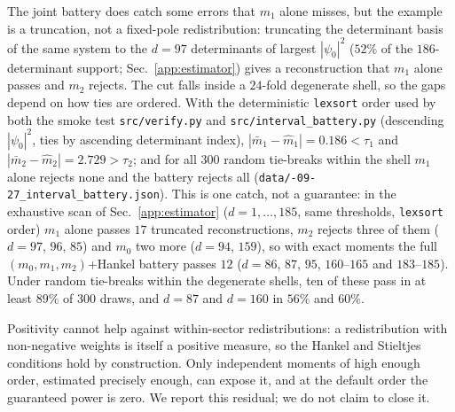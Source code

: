 \documentclass[aps,prb,onecolumn,superscriptaddress,longbibliography,floatfix]{revtex4-2}
\begin{document}
The joint battery does catch some errors that $m_1$ alone misses, but the example is a truncation, not a fixed-pole redistribution: truncating the determinant basis of the same system to the $d=97$ determinants of largest $|\psi_0|^2$ ($52\%$ of the $186$-determinant support; Sec.~\ref{app:estimator}) gives a reconstruction that $m_1$ alone passes and $m_2$ rejects. The cut falls inside a $24$-fold degenerate shell, so the gaps depend on how ties are ordered. With the deterministic \texttt{lexsort} order used by both the smoke test \texttt{src/verify.py} and \texttt{src/\allowbreak interval\_battery.py} (descending $|\psi_0|^2$, ties by ascending determinant index), $|\bar m_1-\widehat m_1|=0.186<\tau_1$ and $|\bar m_2-\widehat m_2|=2.729>\tau_2$; and for all $300$ random tie-breaks within the shell $m_1$ alone rejects none and the battery rejects all (\texttt{data/-09-27\_interval\_battery.json}). This is one catch, not a guarantee: in the exhaustive scan of Sec.~\ref{app:estimator} ($d=1,\dots,185$, same thresholds, \texttt{lexsort} order) $m_1$ alone passes $17$ truncated reconstructions, $m_2$ rejects three of them ($d=97$, $96$, $85$) and $m_0$ two more ($d=94$, $159$), so with exact moments the full $(m_0,m_1,m_2)$+Hankel battery passes $12$ ($d=86$, $87$, $95$, $160$--$165$ and $183$--$185$). Under random tie-breaks within the degenerate shells, ten of these pass in at least $89\%$ of $300$ draws, and $d=87$ and $d=160$ in $56\%$ and $60\%$.

Positivity cannot help against within-sector redistributions: a redistribution with non-negative weights is itself a positive measure, so the Hankel and Stieltjes conditions hold by construction. Only independent moments of high enough order, estimated precisely enough, can expose it, and at the default order the guaranteed power is zero. We report this residual; we do not claim to close it.
\end{document}
